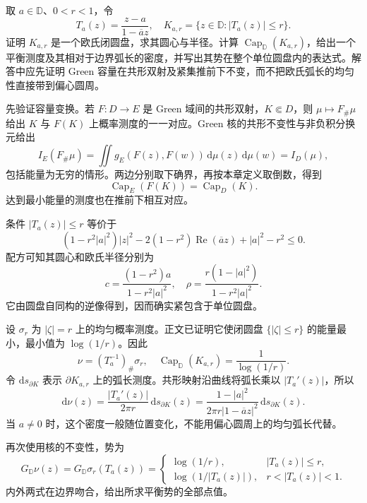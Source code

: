 \begin{exercise}\label{b3:ex:17-draft-05}
取 \(a\in\mathbb D\)、\(0<r<1\)，令
\[
 T_a(z)=\frac{z-a}{1-\overline a z},\quad
 K_{a,r}=\{z\in\mathbb D:|T_a(z)|\le r\}.
\]
证明 \(K_{a,r}\) 是一个欧氏闭圆盘，求其圆心与半径。计算 \(\operatorname{Cap}_{\mathbb D}(K_{a,r})\)，给出一个平衡测度及其相对于边界弧长的密度，并写出其势在整个单位圆盘内的表达式。解答中应先证明 Green 容量在共形双射及紧集推前下不变，而不把欧氏弧长的均匀性直接带到偏心圆周。
\end{exercise}
\begin{solution}
先验证容量变换。若 \(F:D\to E\) 是 Green 域间的共形双射，\(K\Subset D\)，则 \(\mu\mapsto F_\#\mu\) 给出 \(K\) 与 \(F(K)\) 上概率测度的一一对应。Green 核的共形不变性与非负积分换元给出
\[
 I_E(F_\#\mu)
 =\iint g_E(F(z),F(w))\,\mathrm d\mu(z)\,\mathrm d\mu(w)
 =I_D(\mu),
\]
包括能量为无穷的情形。两边分别取下确界，再按本章定义取倒数，得到
\[
 \operatorname{Cap}_E(F(K))=\operatorname{Cap}_D(K).
\]
达到最小能量的测度也在推前下相互对应。

条件 \(|T_a(z)|\le r\) 等价于
\[
 (1-r^2|a|^2)|z|^2
 -2(1-r^2)\operatorname{Re}(\overline a z)+|a|^2-r^2\le0.
\]
配方可知其圆心和欧氏半径分别为
\[
 c=\frac{(1-r^2)a}{1-r^2|a|^2},\quad
 \rho=\frac{r(1-|a|^2)}{1-r^2|a|^2}.
\]
它由圆盘自同构的逆像得到，因而确实紧包含于单位圆盘。

设 \(\sigma_r\) 为 \(|\zeta|=r\) 上的均匀概率测度。正文已证明它使闭圆盘 \(\{|\zeta|\le r\}\) 的能量最小，最小值为 \(\log(1/r)\)。因此
\[
 \nu=(T_a^{-1})_\#\sigma_r,
 \quad \operatorname{Cap}_{\mathbb D}(K_{a,r})=\frac1{\log(1/r)}.
\]
令 \(\mathrm ds_{\partial K}\) 表示 \(\partial K_{a,r}\) 上的弧长测度。共形映射沿曲线将弧长乘以 \(|T_a'(z)|\)，所以
\[
 \mathrm d\nu(z)
 =\frac{|T_a'(z)|}{2\pi r}\,\mathrm ds_{\partial K}(z)
 =\frac{1-|a|^2}{2\pi r|1-\overline a z|^2}
       \,\mathrm ds_{\partial K}(z).
\]
当 \(a\ne0\) 时，这个密度一般随位置变化，不能用偏心圆周上的均匀弧长代替。

再次使用核的不变性，势为
\[
 G_{\mathbb D}\nu(z)
 =G_{\mathbb D}\sigma_r(T_a(z))
 =\begin{cases}
 \log(1/r),&|T_a(z)|\le r,\\[2pt]
 \log(1/|T_a(z)|),&r<|T_a(z)|<1.
 \end{cases}
\]
内外两式在边界吻合，给出所求平衡势的全部点值。
\end{solution}

